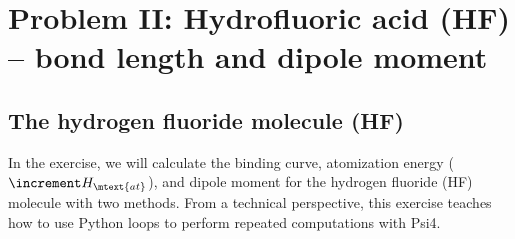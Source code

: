 
\section{Problem II: Hydrofluoric acid (HF) -- bond length and dipole moment} \label{sec:problemII}

\subsection*{The hydrogen fluoride molecule (HF)}

In the exercise, we will calculate the binding curve, atomization energy (\( \increment H_\mtext{at} \)), and dipole moment for the hydrogen fluoride (HF) molecule with two methods. 
From a technical perspective, this exercise teaches how to use Python loops to perform repeated computations with Psi4. 

